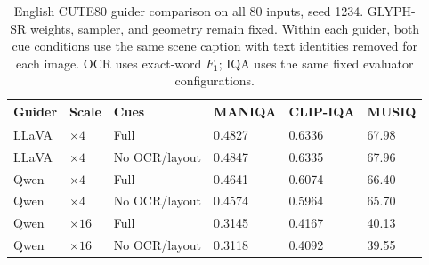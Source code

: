 \begin{table}[H]
\centering
\caption{English CUTE80 guider comparison on all 80 inputs, seed 1234. GLYPH-SR weights, sampler, and geometry remain fixed. Within each guider, both cue conditions use the same scene caption with text identities removed for each image. OCR uses exact-word $F_1$; IQA uses the same fixed evaluator configurations.}
\label{tab:ar-common-english-iqa}
\small
\setlength{\tabcolsep}{4pt}
\begin{tabular}{llllll}
\toprule
Guider & Scale & Cues & MANIQA & CLIP-IQA & MUSIQ \\
\midrule
LLaVA & $\times4$ & Full & 0.4827 & 0.6336 & 67.98 \\
LLaVA & $\times4$ & No OCR/layout & 0.4847 & 0.6335 & 67.96 \\
Qwen & $\times4$ & Full & 0.4641 & 0.6074 & 66.40 \\
Qwen & $\times4$ & No OCR/layout & 0.4574 & 0.5964 & 65.70 \\
Qwen & $\times16$ & Full & 0.3145 & 0.4167 & 40.13 \\
Qwen & $\times16$ & No OCR/layout & 0.3118 & 0.4092 & 39.55 \\
\bottomrule
\end{tabular}
\end{table}
